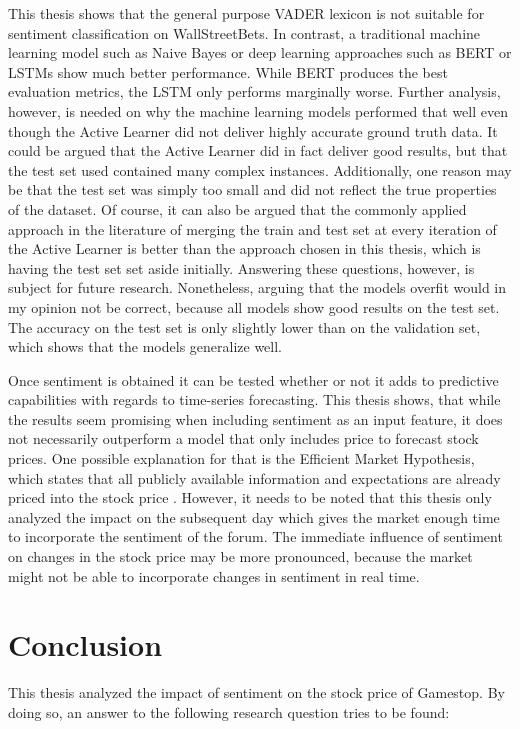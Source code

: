 \documentclass[11pt, a4paper]{article}
\begin{document}
This thesis shows that the general purpose VADER lexicon is not suitable for sentiment classification on WallStreetBets.
In contrast, a traditional machine learning model such as Naive Bayes or deep learning approaches such as BERT or LSTMs
show much better performance. While BERT produces the best evaluation metrics, the LSTM only performs marginally worse.
Further analysis, however, is needed on why the machine learning models performed that well even 
though the Active Learner did not deliver highly accurate ground truth data. 
It could be argued that the Active Learner did in fact deliver good results, but that the test set used contained many
complex instances.
Additionally, one reason may be that the test set was simply too small and did not reflect the true properties of the dataset.
Of course, it can also be argued that the commonly applied approach in the literature of merging the train and test set at 
every iteration of the Active Learner is better than the approach chosen in this thesis, which is having the test set set aside initially.
Answering these questions, however, is subject for future research.
Nonetheless, arguing that the models overfit would in my opinion not be correct, because all models show good results on the test set.
The accuracy on the test set is only slightly lower than on the validation set, which shows that the models generalize well.


Once sentiment is obtained it can be tested whether or not it adds to predictive capabilities with regards to time-series forecasting.
This thesis shows, that while the results seem promising when including sentiment as an input feature, it does not necessarily outperform a
model that only includes price to forecast stock prices. One possible explanation for that is the Efficient Market Hypothesis, which states
that all publicly available information and expectations are already priced into the stock price \citep{fama1970emh}.
However, it needs to be noted that this thesis only analyzed the impact on the subsequent day which gives the market enough time to incorporate
the sentiment of the forum. The immediate influence of sentiment on changes in the stock price may be more pronounced, because the market might
not be able to incorporate changes in sentiment in real time.



\section{Conclusion}
This thesis analyzed the impact of sentiment on the stock price of Gamestop. By doing so, an answer to the following
research question tries to be found:
\end{document}
